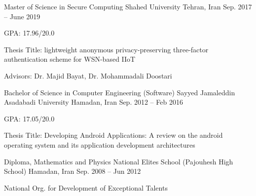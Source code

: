 

\begin{cventries}

  \cventry
    {Master of Science in Secure Computing} %
    {Shahed University} %
    {Tehran, Iran} %
    {Sep. 2017 -- June 2019} %
    {
      \begin{cvitems}
        \item {GPA: 17.96/20.0}
        \item {Thesis Title: lightweight anonymous privacy-preserving three-factor authentication scheme for WSN-based IIoT}
        \item {Advisors: Dr. Majid Bayat, Dr. Mohammadali Doostari}
      \end{cvitems}
    }

  \cventry
    {Bachelor of Science in Computer Engineering (Software)}
    {Sayyed Jamaleddin Asadabadi University} 
    {Hamadan, Iran} 
    {Sep. 2012 -- Feb 2016} 
    {
      \begin{cvitems} 
        \item {GPA: 17.05/20.0}
        \item {Thesis Title: Developing Android Applications: A review on the android operating system and its application development architectures}
      \end{cvitems}
    }

  \cventry
    {Diploma, Mathematics and Physics}
    {National Elites School (Pajouhesh High School)}
    {Hamadan, Iran}
    {Sep. 2008 -- Jun 2012}
    {
      \begin{cvitems}
        \item {National Org. for Development of Exceptional Talents}
      \end{cvitems}
    }
\end{cventries}
